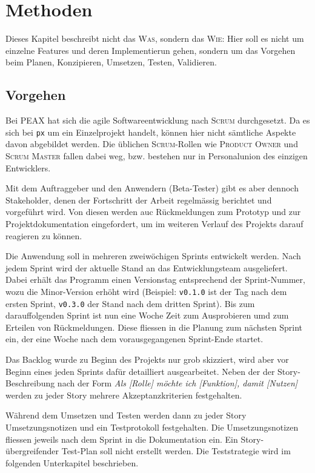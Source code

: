 \section{Methoden}

Dieses Kapitel beschreibt nicht das \textsc{Was}, sondern das \textsc{Wie}: Hier soll es nicht um einzelne Features und deren Implementierun gehen, sondern um das Vorgehen beim Planen, Konzipieren, Umsetzen, Testen, Validieren. 

\subsection{Vorgehen}
\label{sec:Vorgehen}

Bei PEAX hat sich die agile Softwareentwicklung nach \textsc{Scrum} durchgesetzt. Da es sich bei \texttt{px} um ein Einzelprojekt handelt, können hier nicht sämtliche Aspekte davon abgebildet werden. Die üblichen \textsc{Scrum}-Rollen wie \textsc{Product Owner} und \textsc{Scrum Master} fallen dabei weg, bzw. bestehen nur in Personalunion des einzigen Entwicklers.

Mit dem Auftraggeber und den Anwendern (Beta-Tester) gibt es aber dennoch Stakeholder, denen der Fortschritt der Arbeit regelmässig berichtet und vorgeführt wird. Von diesen werden auc Rückmeldungen zum Prototyp und zur Projektdokumentation eingefordert, um im weiteren Verlauf des Projekts darauf reagieren zu können.

Die Anwendung soll in mehreren zweiwöchigen Sprints entwickelt werden. Nach jedem Sprint wird der aktuelle Stand an das Entwicklungsteam ausgeliefert. Dabei erhält das Programm einen Versionstag entsprechend der Sprint-Nummer, wozu die Minor-Version erhöht wird (Beispiel: \texttt{v0.1.0} ist der Tag nach dem ersten Sprint, \texttt{v0.3.0} der Stand nach dem dritten Sprint). Bis zum darauffolgenden Sprint ist nun eine Woche Zeit zum Ausprobieren umd zum Erteilen von Rückmeldungen. Diese fliessen in die Planung zum nächsten Sprint ein, der eine Woche nach dem vorausgegangenen Sprint-Ende startet.

Das Backlog wurde zu Beginn des Projekts nur grob skizziert, wird aber vor Beginn eines jeden Sprints dafür detailliert ausgearbeitet. Neben der der Story-Beschreibung nach der Form \textit{Als [Rolle] möchte ich [Funktion], damit [Nutzen]} werden zu jeder Story mehrere Akzeptanzkriterien festgehalten.

Während dem Umsetzen und Testen werden dann zu jeder Story Umsetzungsnotizen und ein Testprotokoll festgehalten. Die Umsetzungsnotizen fliessen jeweils nach dem Sprint in die Dokumentation ein. Ein Story-übergreifender Test-Plan soll nicht erstellt werden. Die Teststrategie wird im folgenden Unterkapitel beschrieben.


